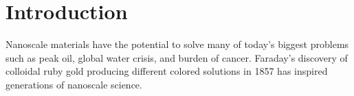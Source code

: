 \section{Introduction}

Nanoscale materials have the potential to solve many of today's biggest problems such as peak oil, global water crisis, and burden of cancer.
Faraday's discovery of colloidal ruby gold producing different colored solutions in 1857 \cite{Faraday_1857,Thompson_2007} has inspired generations of nanoscale science.


  
  